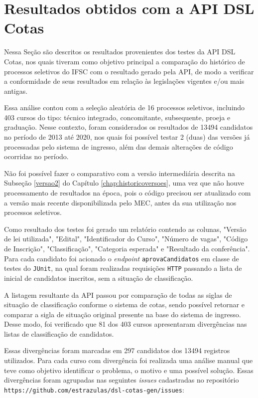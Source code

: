 \section{Resultados obtidos com a API DSL Cotas}
\label{sec:avaliacaoapi}

Nessa Seção são descritos os resultados provenientes dos testes da API DSL Cotas, nos quais tiveram como objetivo principal a comparação do histórico de processos seletivos do \gls{IFSC} com o resultado gerado pela API, de modo a verificar a conformidade de seus resultados em relação às legislações vigentes e/ou mais antigas.

Essa análise contou com a seleção aleatória de 16 processos seletivos, incluindo 403 cursos do tipo: técnico integrado, concomitante, subsequente, proeja e graduação. Nesse contexto, foram considerados os resultados de 13494 candidatos no período de 2013 até 2020, nos quais foi possível testar 2 (duas) das versões já processadas pelo sistema de ingresso, além das demais alterações de código ocorridas no período. 

Não foi possível fazer o comparativo com a versão intermediária descrita na Subseção \ref{versao2} do Capítulo \ref{chap:historicoversoes}, uma vez que não houve processamento de resultados na época, pois o código precisou ser atualizado com a versão mais recente disponibilizada pelo MEC, antes da sua utilização nos processos seletivos.

Como resultado dos testes foi gerado um relatório contendo as colunas, "Versão de lei utilizada", "Edital", "Identificador do Curso", "Número de vagas", "Código de Inscrição", "Classificação", "Categoria esperada" e "Resultado da conferência". Para cada candidato foi acionado o \textit{endpoint} \texttt{aprovaCandidatos} em classe de testes do \texttt{JUnit}, na qual foram realizadas requisições \texttt{HTTP} passando a lista de inicial de candidatos inscritos, sem a situação de classificação.

A listagem resultante da API passou por comparação de todas as siglas de situação de classificação conforme o sistema de cotas, sendo possível retornar e comparar a sigla de situação original presente na base do sistema de ingresso. Desse modo, foi verificado que 81 dos 403 cursos apresentaram divergências nas listas de classificação de candidatos.

Essas divergências foram marcadas em 297 candidatos dos 13494 registros utilizados. Para cada curso com divergência foi realizada uma análise manual que teve como objetivo identificar o problema, o motivo e uma possível solução. Essas divergências foram agrupadas nas seguintes \textit{issues} cadastradas no repositório \texttt{https://github.com/estrazulas/dsl-cotas-gen/issues}:

